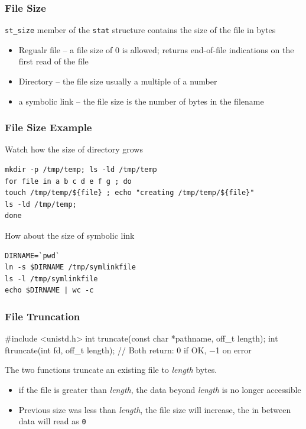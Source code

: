 \documentclass[newPxFont,sthlmFooter,nooffset]{beamer}
\begin{document}
\begin{frame}[t]
  \frametitle{File Size}
\texttt{st\_size} member of the \texttt{stat} structure contains the size of the file in bytes 
\begin{itemize}
\item Regualr file -- a file size of 0 is allowed; returns end-of-file indications on the first read of the file
\item Directory -- the file size usually a multiple of a number
\item a symbolic link -- the file size is the number of bytes in the filename
\end{itemize}
\end{frame}


\begin{frame}[fragile,t]
  \frametitle{File Size Example}

Watch how the size of directory grows

\begin{verbatim}
mkdir -p /tmp/temp; ls -ld /tmp/temp
for file in a b c d e f g ; do
touch /tmp/temp/${file} ; echo "creating /tmp/temp/${file}" 
ls -ld /tmp/temp; 
done
\end{verbatim}

How about the size of symbolic link
\begin{verbatim}
DIRNAME=`pwd`
ln -s $DIRNAME /tmp/symlinkfile
ls -l /tmp/symlinkfile
echo $DIRNAME | wc -c
\end{verbatim}
\end{frame}

\begin{frame}[containsverbatim,t]
  \frametitle{File Truncation}
\begin{codedef}
#include <unistd.h>
int truncate(const char *pathname, off_t length); 
int ftruncate(int fd, off_t length);
// Both return: 0 if OK, −1 on error   
\end{codedef}
The two functions truncate an existing file to \textit{length} bytes. 
\begin{itemize}
\item if the file is greater than \textit{length}, the data beyond \textit{length} is no longer accessible
\item Previous size was less than \textit{length}, the file size will increase, the in between data will read as \texttt{0}
\end{itemize}

\end{frame}
\end{document}

